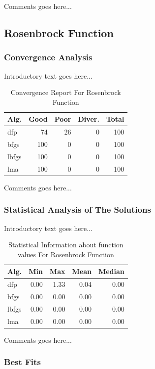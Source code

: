 \documentclass{ieeeaccess}
\begin{document}
Comments goes here...
\subsection{Rosenbrock Function}
\label{rosenbrock2d2D}

\subsubsection{Convergence Analysis}
\label{convergencerosenbrock2d2D}


Introductory text goes here...
\begin{table}
\centering
\caption{Convergence Report For Rosenbrock Function}
\label{convergence:rosenbrock2d}
\begin{tabular}{lrrrr}
\toprule
 Alg. &  Good &  Poor &  Diver. &  Total \\
\midrule
  dfp &    74 &    26 &       0 &    100 \\
 bfgs &   100 &     0 &       0 &    100 \\
lbfgs &   100 &     0 &       0 &    100 \\
  lma &   100 &     0 &       0 &    100 \\
\bottomrule
\end{tabular}
\end{table}


Comments goes here...
\subsubsection{Statistical Analysis of The Solutions}
\label{statisticalanalysisrosenbrock2d2D}


Introductory text goes here...
\begin{table}
\centering
\caption{Statistical Information about function values For Rosenbrock Function}
\label{function_values:rosenbrock2d}
\begin{tabular}{lrrrr}
\toprule
 Alg. &  Min &  Max &  Mean &  Median \\
\midrule
  dfp & 0.00 & 1.33 &  0.04 &    0.00 \\
 bfgs & 0.00 & 0.00 &  0.00 &    0.00 \\
lbfgs & 0.00 & 0.00 &  0.00 &    0.00 \\
  lma & 0.00 & 0.00 &  0.00 &    0.00 \\
\bottomrule
\end{tabular}
\end{table}


Comments goes here...
\subsubsection{Best Fits}
\label{bestfitsrosenbrock2d2D}
\end{document}
